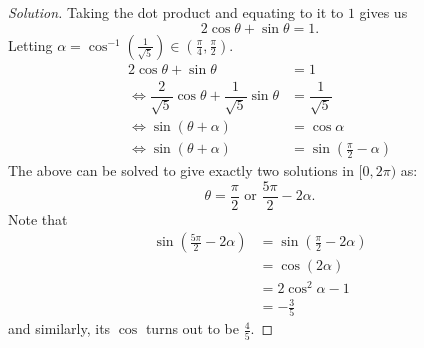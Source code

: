 \documentclass[12pt]{article}
\theoremstyle{definition}
\newenvironment{soln}{\begin{proof}[Solution]}{\end{proof}}
\begin{document}
\begin{itemize}
\begin{soln}
		Taking the dot product and equating to it to $1$ gives us
		\begin{equation*} 
			2\cos\theta + \sin\theta = 1.
		\end{equation*}
		Letting $\alpha = \cos^{-1}\left(\frac{1}{\sqrt{5}}\right) \in \left(\frac{\pi}{4}, \frac{\pi}{2}\right).$
		\begin{align*} 
			2\cos\theta + \sin\theta &= 1\\
			\iff \dfrac{2}{\sqrt{5}}\cos\theta + \dfrac{1}{\sqrt{5}}\sin\theta &= \dfrac{1}{\sqrt{5}}\\
			\iff \sin(\theta + \alpha) &= \cos \alpha\\
			\iff \sin(\theta + \alpha) &= \sin \left(\frac{\pi}{2} - \alpha\right)
		\end{align*}
		The above can be solved to give exactly two solutions in $[0, 2\pi)$ as:
		\begin{equation*} 
			\theta = \frac{\pi}{2} \text{ or } \frac{5\pi}{2} - 2\alpha.
		\end{equation*}
		Note that
		\begin{align*} 
			\sin\left(\frac{5\pi}{2} - 2\alpha\right) &= \sin\left(\frac{\pi}{2} - 2\alpha\right)\\
			&= \cos\left(2\alpha\right)\\
			&= 2\cos^2\alpha - 1\\
			&= -\frac{3}{5}
		\end{align*}
		and similarly, its $\cos$ turns out to be $\frac{4}{5}.$


\end{soln}
\end{itemize}
\end{document}
